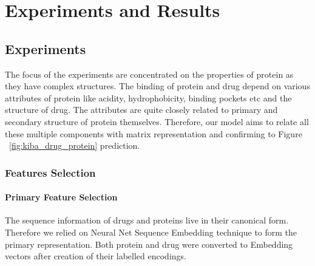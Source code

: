 \chapter{Experiments and Results}


\section{Experiments}

The focus of the experiments are concentrated on the properties of protein as they have complex structures. The binding of protein and drug depend on various attributes of protein like acidity, hydrophobicity, binding pockets etc and the structure of drug. The attributes are quite closely related to primary and secondary structure of protein themselves. Therefore, our model aims to relate all these multiple components with matrix representation and confirming to Figure ~\ref{fig:kiba_drug_protein} prediction.

\subsection{Features Selection}
\subsubsection{Primary Feature Selection}
The sequence information of drugs and proteins live in their canonical form. 
Therefore we relied on Neural Net Sequence Embedding technique to form the primary representation. Both protein and drug were converted to Embedding vectors after creation of their labelled encodings. 

